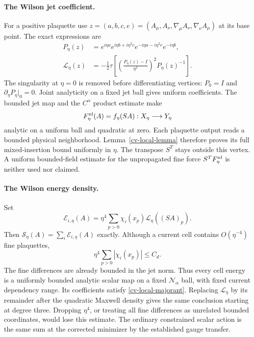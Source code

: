 \documentclass[11pt]{article}
\theoremstyle{remark}
\begin{document}
\paragraph{The Wilson jet coefficient.}
For a positive plaquette use
$z=(a,b,c,e)=(A_\mu,A_\nu,\nabla_\mu A_\nu,
\nabla_\nu A_\mu)$ at its base point. The exact expressions are
\begin{equation}\label{cv-wilson-jet}
 \begin{split}
 P_\eta(z)&=e^{i\eta a}e^{i\eta b+i\eta^2c}
                 e^{-i\eta a-i\eta^2e}e^{-i\eta b},\\
 \mathcal L_\eta(z)&=-\frac12\tau\left[
       \left(\frac{P_\eta(z)-I}{\eta^2}\right)^2
                                      P_\eta(z)^{-1}\right].
 \end{split}
\end{equation}
The singularity at $\eta=0$ is removed before differentiating
vertices: $P_0=I$ and $\partial_\eta P_\eta|_0=0$.
Joint analyticity on a fixed jet ball gives uniform
coefficients. The bounded jet map and the $C^\alpha$
product estimate make
\[
 F_\eta^{\rm nl}(A)=f_\eta(SA):X_\eta\longrightarrow Y_\eta
\]
analytic on a uniform ball and quadratic at zero. Each
plaquette output reads a bounded physical neighborhood.
Lemma~\ref{cv-local-lemma} therefore proves its full
mixed-insertion bound uniformly in $\eta$.
The transpose $S^T$ stays outside this vertex. A uniform
bounded-field estimate for the unpropagated fine force
$S^TF_\eta^{\rm nl}$ is neither used nor claimed.

\paragraph{The Wilson energy density.}
Set
\begin{equation}\label{cv-cell-energy}
 \mathcal E_{i,\eta}(A)=\eta^4\sum_{p>0}
       \chi_i(x_p)\mathcal L_\eta((SA)_p).
\end{equation}
Then $\mathcal S_\eta(A)=\sum_i\mathcal E_{i,\eta}(A)$
exactly. Although a current cell contains $O(\eta^{-4})$
fine plaquettes,
\begin{equation}\label{cv-cell-mass}
 \eta^4\sum_{p>0}|\chi_i(x_p)|\le C_d.
\end{equation}
The fine differences are already bounded in the jet norm.
Thus every cell energy is a uniformly bounded analytic
scalar map on a fixed $\mathcal N_\alpha$ ball, with fixed
current dependency range. Its coefficients satisfy
\eqref{cv-local-majorant}. Replacing $\mathcal L_\eta$ by
its remainder after the quadratic Maxwell density gives
the same conclusion starting at degree three. Dropping
$\eta^4$, or treating all fine differences as unrelated
bounded coordinates, would lose this estimate.
The ordinary constrained scalar action is the same sum at
the corrected minimizer by the established gauge transfer.
\end{document}
